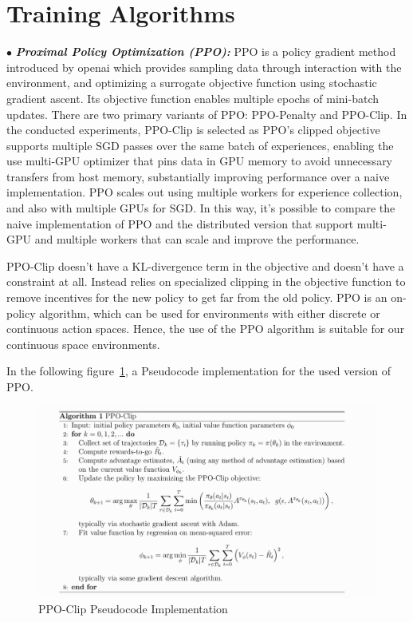 \section{Training Algorithms}

$\bullet$ \textit{\textbf{Proximal Policy Optimization (PPO):}} PPO is a policy gradient method introduced by openai which provides sampling data through interaction with the environment, and optimizing a surrogate objective function using stochastic gradient ascent. Its objective function enables multiple epochs of mini-batch updates. There are two primary variants of PPO: PPO-Penalty and PPO-Clip. In the conducted experiments, PPO-Clip is selected as PPO’s clipped objective supports multiple SGD passes over the same batch of experiences, enabling the use multi-GPU optimizer that pins data in GPU memory to avoid unnecessary transfers from host memory, substantially improving performance over a naive implementation. PPO scales out using multiple workers for experience collection, and also with multiple GPUs for SGD. In this way, it's possible to compare the naive implementation of PPO and the distributed version that support multi-GPU and multiple workers that can scale and improve the performance.

PPO-Clip doesn’t have a KL-divergence term in the objective and doesn’t have a constraint at all. Instead relies on specialized clipping in the objective function to remove incentives for the new policy to get far from the old policy. PPO is an on-policy algorithm, which can be used for environments with either discrete or continuous action spaces. Hence, the use of the PPO algorithm is suitable for our continuous space environments.

In the following figure~\ref{fig:ppo_algorithm}, a Pseudocode implementation for the used version of PPO.
\begin{figure}[!htb]
	\centering
	\includegraphics[width=\linewidth]{figures/ppo.png}
	\caption{PPO-Clip Pseudocode Implementation}
	\label{fig:ppo_algorithm}
\end{figure}


